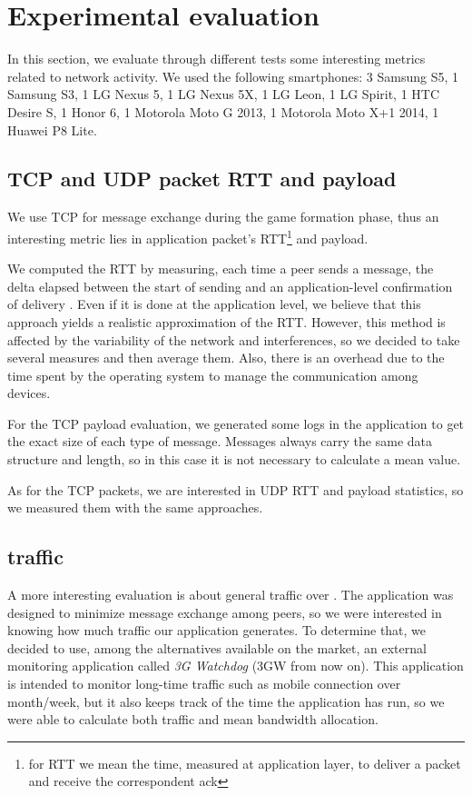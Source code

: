 \section{Experimental evaluation}

In this section, we evaluate through different tests some interesting metrics
related to network activity. We used the following smartphones: 3 Samsung S5,
1 Samsung S3, 1 LG Nexus 5, 1 LG Nexus 5X, 1 LG Leon, 1 LG Spirit, 1 HTC Desire
S, 1 Honor 6, 1 Motorola Moto G 2013, 1 Motorola Moto X+1 2014, 1 Huawei P8
Lite.

\subsection{TCP and UDP packet RTT and payload}
We use TCP for message exchange during the game formation phase, thus an interesting metric lies in application packet's RTT\footnote{for RTT we mean the time, measured at application layer, to deliver a packet and receive the correspondent ack} and payload.

We computed the RTT by measuring, each time a peer sends a message, the delta
elapsed between the start of sending and an application-level confirmation of
delivery . Even if it is done at the application level, we believe that this
approach yields a realistic approximation of the RTT.
However, this method is affected by the variability of the network and
interferences, so we decided to take several measures and then average them.
Also, there is an overhead due to the time spent by the operating system to
manage the communication among devices.

For the TCP payload evaluation, we generated some logs in the application to get the exact size of each type of message. Messages always carry the same data structure and length, so in this case it is not necessary to calculate a mean value.

As for the TCP packets, we are interested in UDP RTT and payload statistics, so we measured them with the same approaches.

\subsection{\wifi{} traffic}

A more interesting evaluation is about general traffic over \wifi. The
application was designed to minimize message exchange among peers, so we were
interested in knowing how much traffic our application generates. To determine
that, we decided to use, among the alternatives available on the market, an
external monitoring application called \textit{3G Watchdog} (3GW from now on).
This application is intended to monitor long-time traffic such as mobile
connection over month/week, but it also keeps track of the time the
application has run, so we were able to calculate both traffic and mean
bandwidth allocation.

